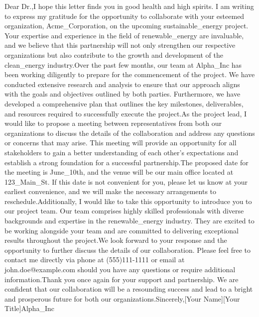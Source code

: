 Dear Dr.,I hope this letter finds you in good health and high spirits. I am writing to express my gratitude for the opportunity to collaborate with your esteemed organization, Acme_Corporation, on the upcoming sustainable_energy project. Your expertise and experience in the field of renewable_energy are invaluable, and we believe that this partnership will not only strengthen our respective organizations but also contribute to the growth and development of the clean_energy industry.Over the past few months, our team at Alpha_Inc has been working diligently to prepare for the commencement of the project. We have conducted extensive research and analysis to ensure that our approach aligns with the goals and objectives outlined by both parties. Furthermore, we have developed a comprehensive plan that outlines the key milestones, deliverables, and resources required to successfully execute the project.As the project lead, I would like to propose a meeting between representatives from both our organizations to discuss the details of the collaboration and address any questions or concerns that may arise. This meeting will provide an opportunity for all stakeholders to gain a better understanding of each other's expectations and establish a strong foundation for a successful partnership.The proposed date for the meeting is June_10th, and the venue will be our main office located at 123_Main_St. If this date is not convenient for you, please let us know at your earliest convenience, and we will make the necessary arrangements to reschedule.Additionally, I would like to take this opportunity to introduce you to our project team. Our team comprises highly skilled professionals with diverse backgrounds and expertise in the renewable_energy industry. They are excited to be working alongside your team and are committed to delivering exceptional results throughout the project.We look forward to your response and the opportunity to further discuss the details of our collaboration. Please feel free to contact me directly via phone at (555)111-1111 or email at john.doe@example.com should you have any questions or require additional information.Thank you once again for your support and partnership. We are confident that our collaboration will be a resounding success and lead to a bright and prosperous future for both our organizations.Sincerely,[Your Name][Your Title]Alpha_Inc